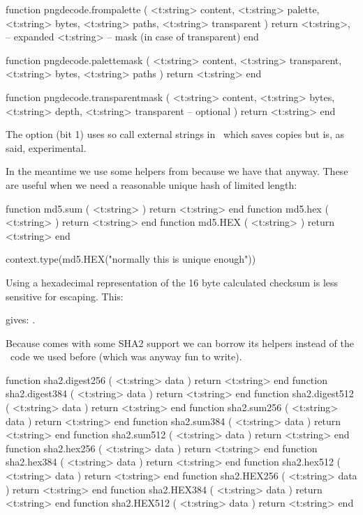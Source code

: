 \starttyping[option=LUA]
function pngdecode.frompalette (
    <t:string> content,
    <t:string> palette,
    <t:string> bytes,
    <t:string> paths,
    <t:string> transparent
)
    return
        <t:string>, -- expanded
        <t:string>  -- mask (in case of transparent)
end

function pngdecode.palettemask (
    <t:string> content,
    <t:string> transparent,
    <t:string> bytes,
    <t:string> paths
)
    return <t:string>
end

function pngdecode.transparentmask (
    <t:string> content,
    <t:string> bytes,
    <t:string> depth,
    <t:string> transparent -- optional
)
    return <t:string>
end
\stoptyping

The  option (bit 1) uses so call external strings
in \LUA\ which saves copies but is, as said, experimental.

\stopsubsection

\startsubsection[title=MD5 hashing]

In the meantime we use some helpers from  because we have that
anyway. These are useful when we need a reasonable unique hash of limited length:

\starttyping[option=LUA]
function md5.sum ( <t:string> ) return <t:string> end
function md5.hex ( <t:string> ) return <t:string> end
function md5.HEX ( <t:string> ) return <t:string> end
\stoptyping

\startbuffer
\startluacode
context.type(md5.HEX("normally this is unique enough"))
\stopluacode
\stopbuffer

Using a hexadecimal representation of the 16 byte calculated checksum is less
sensitive for escaping. This:

\typebuffer

gives: \inlinebuffer.

\stopsubsection

\startsubsection[title=SHA2 hashing]

Because  comes with some SHA2 support we can borrow its helpers
instead of the \LUA\ code we used before (which was anyway fun to write).

\starttyping[option=LUA]
function sha2.digest256 ( <t:string> data ) return <t:string> end
function sha2.digest384 ( <t:string> data ) return <t:string> end
function sha2.digest512 ( <t:string> data ) return <t:string> end
function sha2.sum256    ( <t:string> data ) return <t:string> end
function sha2.sum384    ( <t:string> data ) return <t:string> end
function sha2.sum512    ( <t:string> data ) return <t:string> end
function sha2.hex256    ( <t:string> data ) return <t:string> end
function sha2.hex384    ( <t:string> data ) return <t:string> end
function sha2.hex512    ( <t:string> data ) return <t:string> end
function sha2.HEX256    ( <t:string> data ) return <t:string> end
function sha2.HEX384    ( <t:string> data ) return <t:string> end
function sha2.HEX512    ( <t:string> data ) return <t:string> end
\stoptyping

